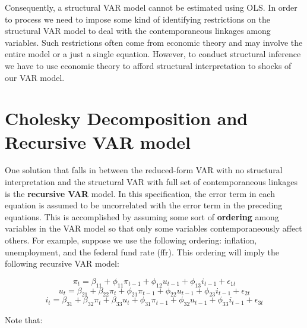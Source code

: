 \documentclass[]{book}
\theoremstyle{definition}
\theoremstyle{definition}
\theoremstyle{definition}
\theoremstyle{remark}
\begin{document}
Consequently, a structural VAR model cannot be estimated using OLS. In order to process we need to impose some kind of identifying restrictions on the structural VAR model to deal with the contemporaneous linkages among variables. Such restrictions often come from economic theory and may involve the entire model or a just a single equation. However, to conduct structural inference we have to use economic theory to afford structural interpretation to shocks of our VAR model.

\hypertarget{cholesky-decomposition-and-recursive-var-model}{%
\section{Cholesky Decomposition and Recursive VAR model}\label{cholesky-decomposition-and-recursive-var-model}}

One solution that falls in between the reduced-form VAR with no structural interpretation and the structural VAR with full set of contemporaneous linkages is the \textbf{recursive VAR} model. In this specification, the error term in each equation is assumed to be uncorrelated with the error term in the preceding equations. This is accomplished by assuming some sort of \textbf{ordering} among variables in the VAR model so that only some variables contemporaneously affect others. For example, suppose we use the following ordering: inflation, unemployment, and the federal fund rate (ffr). This ordering will imply the following recursive VAR model:

\[\pi_t = \beta_{11} + \phi_{11} \pi_{t-1} + \phi_{12} u_{t-1} + \phi_{13} i_{t-1} + \epsilon_{1t}\]
\[u_t = \beta_{21} + \beta_{22} \pi_t+\phi_{21} \pi_{t-1} + \phi_{22} u_{t-1} + \phi_{23} i_{t-1} + \epsilon_{2t}\]
\[i_t = \beta_{31} + \beta_{32}\pi_t + \beta_{33}u_t+ \phi_{31} \pi_{t-1} + \phi_{32} u_{t-1} + \phi_{33} i_{t-1} + \epsilon_{3t}\]

Note that:
\end{document}
